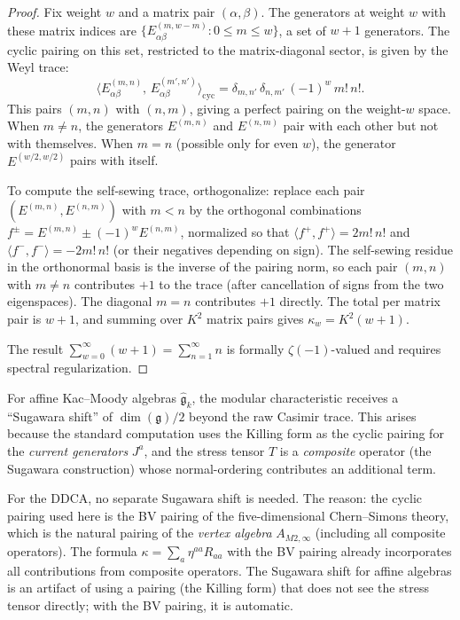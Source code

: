 \documentclass[11pt]{article}
\newcommand{\fg}{\mathfrak{g}}
\begin{document}
\begin{proof}
Fix weight $w$ and a matrix pair $(\alpha,\beta)$.  The
generators at weight $w$ with these matrix indices are
$\{E^{(m,w-m)}_{\alpha\beta} : 0 \leq m \leq w\}$, a set of
$w+1$ generators.  The cyclic pairing on this set, restricted to
the matrix-diagonal sector, is given by the Weyl trace:
\[
\langle E^{(m,n)}_{\alpha\beta},\,
E^{(m',n')}_{\alpha\beta} \rangle_{\mathrm{cyc}}
= \delta_{m,n'}\,\delta_{n,m'}\,(-1)^w\, m!\, n!.
\]
This pairs $(m,n)$ with $(n,m)$, giving a perfect pairing on
the weight-$w$ space.  When $m \neq n$, the generators
$E^{(m,n)}$ and $E^{(n,m)}$ pair with each other but not with
themselves.  When $m = n$ (possible only for even $w$), the
generator $E^{(w/2,w/2)}$ pairs with itself.

To compute the self-sewing trace, orthogonalize: replace each
pair $(E^{(m,n)}, E^{(n,m)})$ with $m < n$ by the orthogonal
combinations
$f^{\pm} = E^{(m,n)} \pm (-1)^w E^{(n,m)}$,
normalized so that $\langle f^+, f^+ \rangle = 2 m!\, n!$ and
$\langle f^-, f^- \rangle = -2 m!\, n!$ (or their negatives
depending on sign).  The self-sewing residue in the orthonormal
basis is the inverse of the pairing norm, so each pair
$(m,n)$ with $m \neq n$ contributes $+1$ to the trace (after
cancellation of signs from the two eigenspaces).  The diagonal
$m = n$ contributes $+1$ directly.  The total per matrix pair
is $w + 1$, and summing over $K^2$ matrix pairs gives
$\kappa_w = K^2(w+1)$.

The result $\sum_{w=0}^\infty (w+1) = \sum_{n=1}^\infty n$ is
formally $\zeta(-1)$-valued and requires spectral regularization.
\end{proof}

\begin{remark}
\label{rem:no-sugawara-shift}
For affine Kac--Moody algebras $\widehat{\fg}_k$, the modular
characteristic receives a ``Sugawara shift'' of $\dim(\fg)/2$
beyond the raw Casimir trace.  This arises because the standard
computation uses the Killing form as the cyclic pairing for the
\emph{current generators} $J^a$, and the stress tensor $T$ is
a \emph{composite} operator (the Sugawara construction) whose
normal-ordering contributes an additional term.

For the DDCA, no separate Sugawara shift is needed.  The reason:
the cyclic pairing used here is the BV pairing of the
five-dimensional Chern--Simons theory, which is the natural
pairing of the \emph{vertex algebra} $A_{M2,\infty}$ (including
all composite operators).  The formula
$\kappa = \sum_a \eta^{aa} R_{aa}$ with the BV pairing already
incorporates all contributions from composite operators.  The
Sugawara shift for affine algebras is an artifact of using a
pairing (the Killing form) that does not see the stress tensor
directly; with the BV pairing, it is automatic.
\end{remark}
\end{document}
